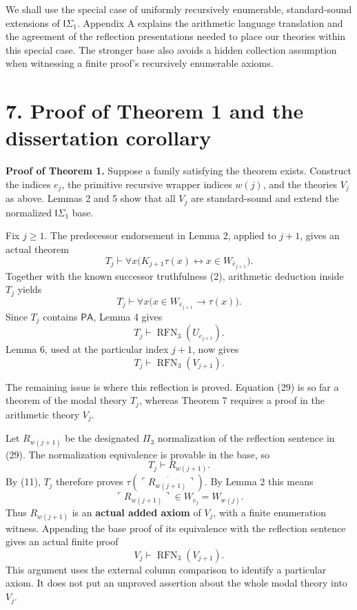 \documentclass[
  11pt,
  letterpaper,
]{article}
\begin{document}
We shall use the special case of uniformly recursively enumerable,
standard-sound extensions of \(\mathsf I\Sigma_1\). Appendix A explains
the arithmetic language translation and the agreement of the reflection
presentations needed to place our theories within this special case. The
stronger base also avoids a hidden collection assumption when witnessing
a finite proof's recursively enumerable axioms.

\section{7. Proof of Theorem 1 and the dissertation
corollary}\label{proof-of-theorem-1-and-the-dissertation-corollary}

\textbf{Proof of Theorem 1.} Suppose a family satisfying the theorem
exists. Construct the indices \(e_j\), the primitive recursive wrapper
indices \(w(j)\), and the theories \(V_j\) as above. Lemmas 2 and 5 show
that all \(V_j\) are standard-sound and extend the normalized
\(\mathsf I\Sigma_1\) base.

Fix \(j\geq1\). The predecessor endorsement in Lemma 2, applied to
\(j+1\), gives an actual theorem \[
T_j\vdash\forall x\bigl(K_{j+1}\tau(x)
\leftrightarrow x\in W_{\bar e_{j+1}}\bigr).
\tag{26}
\] Together with the known successor truthfulness (2), arithmetic
deduction inside \(T_j\) yields \[
T_j\vdash\forall x\bigl(x\in W_{\bar e_{j+1}}
\rightarrow\tau(x)\bigr).
\tag{27}
\] Since \(T_j\) contains \(\mathsf{PA}\), Lemma 4 gives \[
T_j\vdash\operatorname{RFN}_3(U_{e_{j+1}}).
\tag{28}
\] Lemma 6, used at the particular index \(j+1\), now gives \[
T_j\vdash\operatorname{RFN}_3(V_{j+1}).
\tag{29}
\]

The remaining issue is where this reflection is proved. Equation (29) is
so far a theorem of the modal theory \(T_j\), whereas Theorem 7 requires
a proof in the arithmetic theory \(V_j\).

Let \(R_{w(j+1)}\) be the designated \(\Pi_3\) normalization of the
reflection sentence in (29). The normalization equivalence is provable
in the base, so \[
T_j\vdash R_{w(j+1)}.
\] By (11), \(T_j\) therefore proves
\(\tau(\overline{\ulcorner R_{w(j+1)}\urcorner})\). By Lemma 2 this
means \[
\ulcorner R_{w(j+1)}\urcorner\in W_{e_j}=W_{w(j)}.
\tag{30}
\] Thus \(R_{w(j+1)}\) is an \textbf{actual added axiom} of \(V_j\),
with a finite enumeration witness. Appending the base proof of its
equivalence with the reflection sentence gives an actual finite proof \[
V_j\vdash\operatorname{RFN}_3(V_{j+1}).
\tag{31}
\] This argument uses the external column comparison to identify a
particular axiom. It does not put an unproved assertion about the whole
modal theory into \(V_j\).
\end{document}
